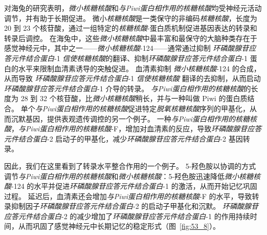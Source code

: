 对海兔的研究表明，\textit{微小核糖核酸}和\textit{与Piwi蛋白相作用的核糖核酸}均受神经元活动调节，并有助于长期促进。
微小\textit{核糖核酸}是一类保守的非编码\textit{核糖核酸}，长度为 20 到 23 个核苷酸，通过一组特定的\textit{核糖核酸}-蛋白质机制促进基因表达的转录和转录后调控。
在海兔中，这些\textit{微小核糖核酸}中最丰富和最保守的大脑种类存在于感觉神经元中，其中之一——\textit{微小核糖核酸}-124——通常通过抑制 \textit{环磷酸腺苷应答元件结合蛋白}-1 \textit{信使核糖核酸}的翻译、抑制\textit{环磷酸腺苷应答元件结合蛋白}-1 蛋白的水平来限制血清素诱导的突触促进。
血清素抑制 \textit{微小核糖核酸}-124 的合成，从而导致 \textit{环磷酸腺苷应答元件结合蛋白}-1 \textit{信使核糖核酸} 翻译的去抑制，从而启动\textit{环磷酸腺苷应答元件结合蛋白}-1 介导的转录。
\textit{与Piwi蛋白相作用的核糖核酸}的长度为 28 到 32 个核苷酸，比\textit{微小核糖核酸}稍长，并与一种叫做 Piwi 的蛋白质结合。
单个\textit{与Piwi蛋白相作用的核糖核酸}促进特定\textit{脱氧核糖核酸}序列的甲基化，从而沉默基因，提供表观遗传调控的另一个例子。
一种\textit{与Piwi蛋白相作用的核糖核酸}，\textit{与Piwi蛋白相作用的核糖核酸}-F，增加对血清素的反应，导致\textit{环磷酸腺苷应答元件结合蛋白}-2 启动子的甲基化，减少\textit{环磷酸腺苷应答元件结合蛋白}-2 基因转录。


因此，我们在这里看到了转录水平整合作用的一个例子。
5-羟色胺以协调的方式调节\textit{与Piwi蛋白相作用的核糖核酸}和\textit{微小核糖核酸}：5-羟色胺迅速降低\textit{微小核糖核酸}-124 的水平并促进\textit{环磷酸腺苷应答元件结合蛋白}-1 的激活，从而开始记忆巩固过程。
延迟后，血清素还会增加\textit{与Piwi蛋白相作用的核糖核酸}-F 的水平，导致转录抑制因子\textit{环磷酸腺苷应答元件结合蛋白}-2 的启动子甲基化和沉默。
\textit{环磷酸腺苷应答元件结合蛋白}-2 的减少增加了\textit{环磷酸腺苷应答元件结合蛋白}-1 的作用持续时间，从而巩固了感觉神经元中长期记忆的稳定形式（图~\ref{fig:53_8}）。


